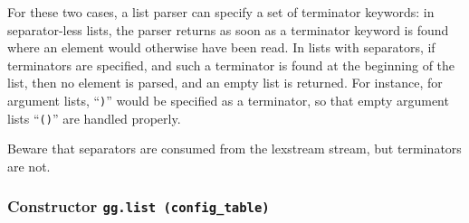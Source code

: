 For these two cases, a list parser can specify a set of terminator
keywords: in separator-less lists, the parser returns as soon as a 
terminator keyword is found where an element would otherwise have been
read. In lists with separators, if terminators are specified, and such
a terminator is found at the beginning of the list, then no element is
parsed, and an empty list is returned. For instance, for argument
lists, ``\verb|)|'' would be specified as a terminator, so that empty
argument lists ``\verb|()|'' are handled properly.

Beware that separators are consumed from the lexstream stream, but
terminators are not.


\subsubsection{Constructor {\tt gg.list (config\_table)}}

